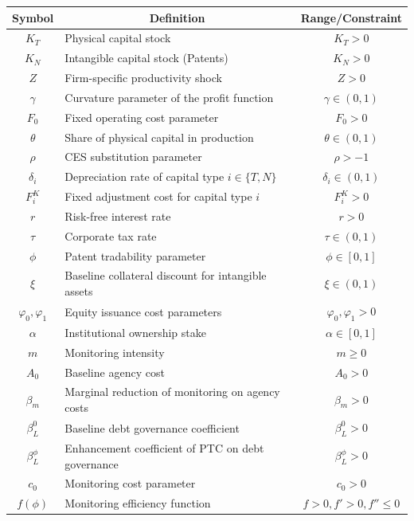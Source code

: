 \documentclass[12pt,a4paper]{article}
\begin{document}
\begin{table}[h!]
\centering
\small
\begin{tabular}{clc}
\hline
\textbf{Symbol} & \multicolumn{1}{c}{\textbf{Definition}} & \textbf{Range/Constraint} \\ \hline
$K_T$ & Physical capital stock & $K_T > 0$ \\
$K_N$ & Intangible capital stock (Patents) & $K_N > 0$ \\
$Z$ & Firm-specific productivity shock & $Z > 0$ \\
$\gamma$ & Curvature parameter of the profit function & $\gamma \in (0,1)$ \\
$F_0$ & Fixed operating cost parameter & $F_0 > 0$ \\
$\theta$ & Share of physical capital in production & $\theta \in (0,1)$ \\
$\rho$ & CES substitution parameter & $\rho > -1$ \\
$\delta_i$ & Depreciation rate of capital type $i \in \{T, N\}$ & $\delta_i \in (0,1)$ \\
$F_i^K$ & Fixed adjustment cost for capital type $i$ & $F_i^K > 0$ \\
$r$ & Risk-free interest rate & $r > 0$ \\
$\tau$ & Corporate tax rate & $\tau \in (0,1)$ \\
$\phi$ & Patent tradability parameter & $\phi \in [0,1]$ \\
$\xi$ & Baseline collateral discount for intangible assets & $\xi \in (0,1)$ \\
$\varphi_0, \varphi_1$ & Equity issuance cost parameters & $\varphi_0, \varphi_1 > 0$ \\
$\alpha$ & Institutional ownership stake & $\alpha \in [0,1]$ \\
$m$ & Monitoring intensity & $m \ge 0$ \\
$A_0$ & Baseline agency cost & $A_0 > 0$ \\
$\beta_m$ & Marginal reduction of monitoring on agency costs & $\beta_m > 0$ \\
$\beta_L^0$ & Baseline debt governance coefficient & $\beta_L^0 > 0$ \\
$\beta_L^\phi$ & Enhancement coefficient of PTC on debt governance & $\beta_L^\phi > 0$ \\
$c_0$ & Monitoring cost parameter & $c_0 > 0$ \\
$f(\phi)$ & Monitoring efficiency function & $f > 0, f' > 0, f'' \le 0$ \\ \hline
\end{tabular}
\end{table}
\end{document}
